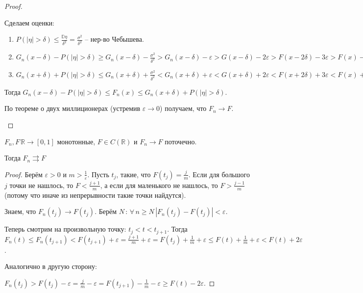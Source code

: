 \begin{proof}
\begin{enumerate}
{            Сделаем оценки:

            \begin{enumerate}
                \item {
                    $P(|\eta| > \delta) \leqslant \frac{\mathbb{D} \eta}{\delta^2} = \frac{\sigma^2}{\delta^2}$ -- нер-во Чебышева.
                }
                \item {
                    $G_{n} (x - \delta) - P(|\eta| > \delta) \geq G_n (x - \delta) - \frac{\sigma^2}{\delta^2} > G_n (x - \delta) - \varepsilon > G(x - \delta) - 2\varepsilon > F(x - 2\delta) - 3\varepsilon > F(x) - 4\varepsilon$
                }
                \item {
                    $G_{n} (x + \delta) + P(|\eta| > \delta) \leq G_n (x + \delta) + \frac{\sigma^2}{\delta^2} < G_n (x + \delta) + \varepsilon < G(x + \delta) + 2\varepsilon < F(x + 2\delta) + 3\varepsilon < F(x) + 4\varepsilon$
                }
            \end{enumerate}

            Тогда $G_{n} (x - \delta) - P(|\eta| > \delta) \leqslant F_n (x) \leqslant G_{n} (x + \delta) + P(|\eta| > \delta)$.

            По теореме о двух миллиционерах (устремив $\varepsilon \to 0$) получаем, что $F_n \to F$.
        }
    \end{enumerate}
\end{proof}

\begin{theorem}
    $F_n, F \, \mathbb{R} \to [0, 1]$ монотонные, $F \in C(\mathbb{R})$ и
    $F_n \to F$ поточечно.

    Тогда $F_n \rightrightarrows F$
\end{theorem}

\begin{proof}
    Берём $\varepsilon > 0$ и $m > \frac{1}{\varepsilon}$. Пусть $t_j$, такие, что $F(t_j) = \frac{j}{m}$. Если для большого $j$ точки не нашлось, то
    $F < \frac{j + 1}{m}$, а если для маленького не нашлось, то $F > \frac{j - 1}{m}$ (потому что иначе из непрерывности такие точки найдутся).

    Знаем, что $F_n(t_j) \rightarrow F(t_j)$. Берём $N \, : \, \forall \, n \geqslant N \, |F_n(t_j) - F(t_j)| < \varepsilon$.

    Теперь смотрим на произвольную точку: $t_j < t < t_{j + 1}$. Тогда
    $F_n(t) \leqslant F_n(t_{j + 1}) < F(t_{j + 1}) + \varepsilon = \frac{j + 1}{m} + \varepsilon = F(t_j) + \frac{1}{m} + \varepsilon \leqslant F(t) + \frac{1}{m} + \varepsilon < F(t) + 2\varepsilon$.

    Аналогично в другую сторону:

    $F_n (t_j) > F(t_j) - \varepsilon = \frac{j}{m} - \varepsilon = F(t_{j + 1}) - \frac{1}{m} - \varepsilon \geqslant F(t) - 2\varepsilon$.

\end{proof}

